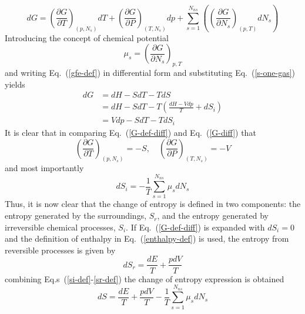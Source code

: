 \documentclass[a4paper]{article}
\newcommand{\eref}[1]{Eq.~(\ref{#1})}
\newcommand{\erefs}[2]{Eq.s~(\ref{#1}-\ref{#2})}
\newcommand{\pd}[2]{\frac{\partial #1}{\partial #2}}
\begin{document}
\begin{enumerate}
\begin{equation}
      dG = \left( \pd{G}{T} \right)_{(p,N_s)} dT
      + \left( \pd{G}{P} \right)_{(T,N_s)} dp
      + \sum\limits_{s=1}^{N_{ns}}{\left( \left( \pd{G}{N_s}
      \right)_{(p,T)} dN_s\right)}
      \label{G-diff}
    \end{equation}
    Introducing the concept of chemical potential
    \begin{equation}
      \mu_s = \left( \frac{\partial G}{\partial N_s} \right)_{p,T}
      \label{mu-def}
    \end{equation}
    and writing \eref{gfe-def} in differential form and substituting
    \eref{s-one-gas} yields
    \begin{equation}
      \begin{aligned}
        dG &= dH - SdT - TdS \\
	         &= dH - SdT - T\left( \frac{dH - Vdp}{T} + dS_i \right) \\
	         &= Vdp - SdT - TdS_i
      \end{aligned}
      \label{G-def-diff}
    \end{equation}
    It is clear that in comparing \eref{G-def-diff} and \eref{G-diff} that
    \begin{equation}
      \left( \pd{G}{T} \right)_{(p,N_s)} = -S, \quad
      \left( \pd{G}{P} \right)_{(T,N_s)} = -V
      \label{G-derivs}
    \end{equation}
    and most importantly
    \begin{equation}
      dS_i = -\frac{1}{T}\sum\limits_{s=1}^{N_{ns}}{\mu_s dN_s}
      \label{si-def}
    \end{equation}
    Thus, it is now clear that the change of entropy is defined in two
    components: the entropy generated by the surroundings, $S_r$, and the
    entropy generated by irreversible chemical processes, $S_i$.  If
    \eref{G-def-diff} is expanded with $dS_i = 0$ and the definition of
    enthalpy in \eref{enthalpy-def} is used, the entropy from reversible
    processes is given
    by
    \begin{equation}
      dS_r = \frac{dE}{T} + \frac{pdV}{T}
      \label{sr-def}
    \end{equation}
    combining \erefs{si-def}{sr-def} the change of entropy expression is
    obtained
    \begin{equation}
      \boxed{dS = \frac{dE}{T} + \frac{pdV}{T} 
      -\frac{1}{T}\sum\limits_{s=1}^{N_{ns}}{\mu_s dN_s}}
      \label{ds-final}
    \end{equation}
    

\end{enumerate}
\end{document}
